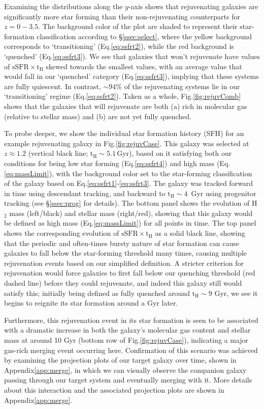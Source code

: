 \documentclass[twocolumn, linenumbers]{aastex631}
\newcommand{\ssfr}{\text{sSFR}}
\newcommand{\tH}{\text{t}_\text{H}}
\newcommand{\eq}{Eq.\hspace{.2em}}
\renewcommand{\fig}{Fig.\hspace{.2em}}
\newcommand{\app}{Appendix\hspace{.2em}}
\begin{document}
Examining the distributions along the $y$-axis shows that rejuvenating galaxies are significantly more star forming than their non-rejuvenating counterparts for $z=0-3.5$.  The background color of the plot are shaded to represent their star-formation classification according to \S\ref{ssec:select}, where the yellow background corresponds to `transitioning' (\eq\ref{eq:ssfrt2}), while the red background is `quenched' (\eq\ref{eq:ssfrt3}).  We see that galaxies that won't rejuvenate have values of $\ssfr\times\tH$ skewed towards the smallest values, with an average value that would fall in our `quenched' category (\eq\ref{eq:ssfrt3}), implying that these systems are fully quiescent.  In contrast, $\sim 94\%$ of the rejuvenating systems lie in our `transitioning' regime (\eq\ref{eq:ssfrt2}).  Taken as a whole, \fig\ref{fig:rejuvComb} shows that the galaxies that will rejuvenate are both (a) rich in molecular gas (relative to stellar mass) and (b) are not yet fully quenched.

To probe deeper, we show the individual star formation history (SFH) for an example rejuvenating galaxy in \fig \ref{fig:rejuvCase}.  This galaxy was selected at $z\approx 1.2$ (vertical black line; $\tH\sim 5.1$\,Gyr), based on it satisfying both our conditions for being low star forming (\eq \ref{eq:ssfrt4}) and high mass (\eq \ref{eq:massLimit}), with the background color set to the star-forming classification of the galaxy based on \eq \ref{eq:ssfrt1}-\ref{eq:ssfrt3}.  The galaxy was tracked forward in time using descendant tracking, and backward to $\tH\sim 4$\, Gyr using progenitor tracking (see \S\ref{ssec:prog} for details).  The bottom panel shows the evolution of H$_2$ mass (left/black) and stellar mass (right/red), showing that this galaxy would be defined as high mass (\eq \ref{eq:massLimit}) for all points in time.  The top panel shows the corresponding evolution of $\ssfr\times\tH$ as a solid black line, showing that the periodic and often-times bursty nature of star formation can cause galaxies to fall below the star-forming threshold many times, causing multiple rejuvenation events based on our simplified definition.  A stricter criterion for rejuvenation would force galaxies to first fall below our quenching threshold (red dashed line) before they could rejuvenate, and indeed this galaxy still would satisfy this; initially being defined as fully quenched around $\tH\sim 9$ Gyr, we see it begins to reignite its star formation around a Gyr later.

Furthermore, this rejuvenation event in its star formation is seen to be associated with a dramatic increase in both the galaxy's molecular gas content and stellar mass at around 10 Gyr (bottom row of \fig \ref{fig:rejuvCase}), indicating a major gas-rich merging event occurring here. Confirmation of this scenario was achieved by examining the projection plots of our target galaxy over time, shown in \app \ref{app:merge}, in which we can visually observe the companion galaxy passing through our target system and eventually merging with it.  More details about this interaction and the associated projection plots are shown in \app \ref{app:merge}.
\end{document}
